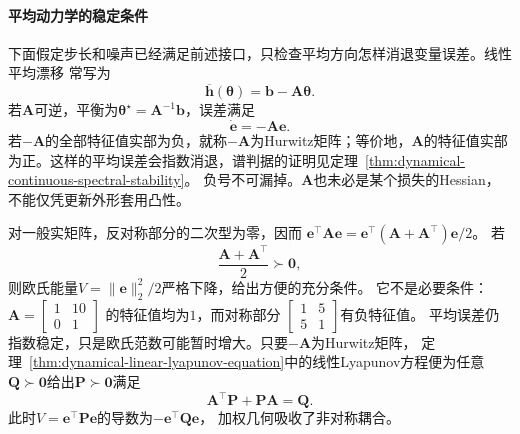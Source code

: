 \paragraph{平均动力学的稳定条件}
\label{sec:dynamical-mean-dynamics-linear-recursion}

下面假定步长和噪声已经满足前述接口，只检查平均方向怎样消退变量误差。线性平均漂移
常写为
\begin{equation}
  \overline{\bm h}(\bm\theta)=\bm b-\bm A\bm\theta.
  \label{eq:dynamical-linear-mean-drift}
\end{equation}
若$\bm A$可逆，平衡为$\bm\theta^\star=\bm A^{-1}\bm b$，误差满足
\begin{equation}
  \dot{\bm e}=-\bm A\bm e.
  \label{eq:dynamical-linear-mean-error-ode}
\end{equation}
若\(-\bm A\)的全部特征值实部为负，就称\(-\bm A\)为Hurwitz矩阵；等价地，\(\bm A\)的特征值实部为正。这样的平均误差会指数消退，谱判据的证明见定理~\ref{thm:dynamical-continuous-spectral-stability}。
负号不可漏掉。$\bm A$也未必是某个损失的Hessian，不能仅凭更新外形套用凸性。

对一般实矩阵，反对称部分的二次型为零，因而
$\bm e^\top\bm A\bm e=\bm e^\top(\bm A+\bm A^\top)\bm e/2$。
若
\begin{equation}
  \frac{\bm A+\bm A^\top}{2}\succ\bm0,
  \label{eq:dynamical-positive-symmetric-part}
\end{equation}
则欧氏能量$V=\|\bm e\|_2^2/2$严格下降，给出方便的充分条件。
它不是必要条件：$\bm A=\left[\begin{smallmatrix}1&10\\0&1\end{smallmatrix}\right]$
的特征值均为$1$，而对称部分
$\left[\begin{smallmatrix}1&5\\5&1\end{smallmatrix}\right]$有负特征值。
平均误差仍指数稳定，只是欧氏范数可能暂时增大。只要$-\bm A$为Hurwitz矩阵，
定理~\ref{thm:dynamical-linear-lyapunov-equation}中的线性Lyapunov方程便为任意$\bm Q\succ\bm0$给出$\bm P\succ\bm0$满足
\begin{equation}
  \bm A^\top\bm P+\bm P\bm A=\bm Q.
  \label{eq:dynamical-mean-drift-lyapunov}
\end{equation}
此时$V=\bm e^\top\bm P\bm e$的导数为$-\bm e^\top\bm Q\bm e$，
加权几何吸收了非对称耦合。

